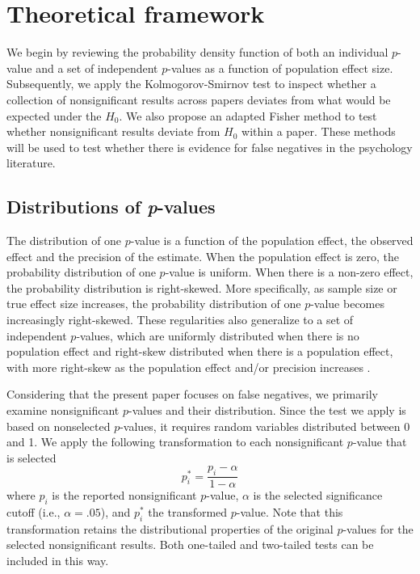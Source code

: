 \documentclass{article}
\begin{document}
\section*{Theoretical framework}

We begin by reviewing the probability density function of both an individual $p$-value and a set of independent $p$-values as a function of population effect size. Subsequently, we apply the Kolmogorov-Smirnov test to inspect whether a collection of nonsignificant results across papers deviates from what would be expected under the $H_0$. We also propose an adapted Fisher method to test whether nonsignificant results deviate from $H_0$ within a paper. These methods will be used to test whether there is evidence for false negatives in the psychology literature.

\subsection*{Distributions of \textit{p}-values}

The distribution of one $p$-value is a function of the population effect, the observed effect and the precision of the estimate. When the population effect is zero, the probability distribution of one $p$-value is uniform. When there is a non-zero effect, the probability distribution is right-skewed. More specifically, as sample size or true effect size increases, the probability distribution of one $p$-value becomes increasingly right-skewed. These regularities also generalize to a set of independent $p$-values, which are uniformly distributed when there is no population effect and right-skew distributed when there is a population effect, with more right-skew as the population effect and/or precision increases \cite{Fisher1925-jl}.

Considering that the present paper focuses on false negatives, we primarily examine nonsignificant $p$-values and their distribution. Since the test we apply is based on nonselected $p$-values, it requires random variables distributed between 0 and 1. We apply the following transformation to each nonsignificant $p$-value that is selected
\begin{equation}
\label{pistar}
p^*_i=\frac{p_i-\alpha}{1-\alpha}
\end{equation}
where $p_i$ is the  reported nonsignificant $p$-value, $\alpha$ is the selected significance cutoff (i.e., $\alpha=.05$), and $p^*_i$ the transformed $p$-value. Note that this transformation retains the distributional properties of the original $p$-values for the selected nonsignificant results. Both one-tailed and two-tailed tests can be included in this way.
\end{document}
